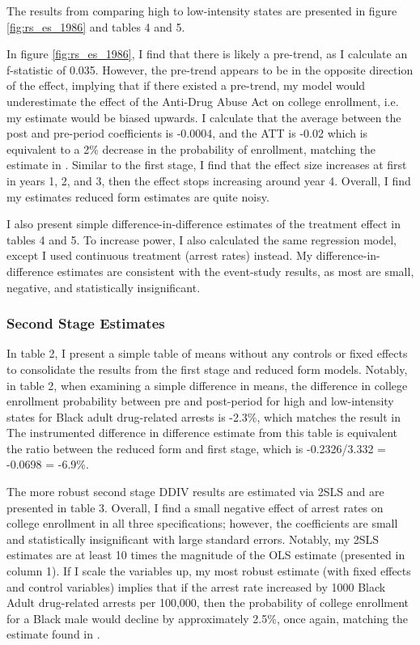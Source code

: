 \documentclass{article}
\begin{document}
The results from comparing high to low-intensity states are presented in figure \ref{fig:rs_es_1986} and tables 4 and 5. 

In figure \ref{fig:rs_es_1986}, I find that there is likely a pre-trend, as I calculate an f-statistic of 0.035. However, the pre-trend appears to be in the opposite direction of the effect, implying that if there existed a pre-trend, my model would underestimate the effect of the Anti-Drug Abuse Act on college enrollment, i.e. my estimate would be biased upwards. I calculate that the average between the post and pre-period coefficients is -0.0004, and the ATT is -0.02 which is equivalent to a 2\% decrease in the probability of enrollment, matching the estimate in \cite{britton2022}. Similar to the first stage, I find that the effect size increases at first in years 1, 2, and 3, then the effect stops increasing around year 4. Overall, I find my estimates reduced form estimates are quite noisy.

I also present simple difference-in-difference estimates of the treatment effect in tables 4 and 5. To increase power, I also calculated the same regression model, except I used continuous treatment (arrest rates) instead. My difference-in-difference estimates are consistent with the event-study results, as most are small, negative, and statistically insignificant.

\subsubsection{Second Stage Estimates}

In table 2, I present a simple table of means without any controls or fixed effects to consolidate the results from the first stage and reduced form models. Notably, in table 2, when examining a simple difference in means, the difference in college enrollment probability between pre and post-period for high and low-intensity states for Black adult drug-related arrests is -2.3\%, which matches the result in \cite{britton2022} The instrumented difference in difference estimate from this table is equivalent the ratio between the reduced form and first stage, which is -0.2326/3.332 = -0.0698 = -6.9\%.

The more robust second stage DDIV results are estimated via 2SLS and are presented in table 3. Overall, I find a small negative effect of arrest rates on college enrollment in all three specifications; however, the coefficients are small and statistically insignificant with large standard errors. Notably, my 2SLS estimates are at least 10 times the magnitude of the OLS estimate (presented in column 1). If I scale the variables up, my most robust estimate (with fixed effects and control variables) implies that if the arrest rate increased by 1000 Black Adult drug-related arrests per 100,000, then the probability of college enrollment for a Black male would decline by approximately 2.5\%, once again, matching the estimate found in \cite{britton2022}.
\end{document}
